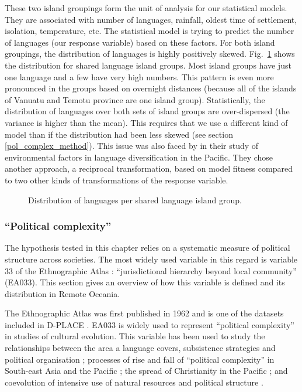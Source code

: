 \documentclass[a4paper,10pt]{article} %
\begin{document}
These two island groupings form the unit of analysis for our statistical models. They are associated with number of languages, rainfall, oldest time of settlement, isolation, temperature, etc. The statistical model is trying to predict the number of languages (our response variable) based on these factors. For both island groupings, the distribution of languages is highly positively skewed. Fig.~\ref{dist_lg_medium} shows the distribution for shared language island groups. Most island groups have just one language and a few have very high numbers. This pattern is even more pronounced in the groups based on overnight distances (because all of the islands of Vanuatu and Temotu province are one island group). Statistically, the distribution of languages over both sets of island groups are over-dispersed (the variance is higher than the mean).
This requires that we use a different kind of model than if the distribution had been less skewed (see section \ref{pol_complex_method}). This issue was also faced by \citet{gavin2012island} in their study of environmental factors in language diversification in the Pacific. They chose another approach, a reciprocal transformation, based on model fitness compared to two other kinds of transformations of the response variable.

\begin{figure}[H]
\centering
\caption{{Distribution of languages per shared language island group.}}
\label{dist_lg_medium}
\end{figure}

\subsubsection{``Political complexity''}
\label{prediting:sec:pol:complex}
The hypothesis tested in this chapter relies on a systematic measure of political structure across societies. The most widely used variable in this regard is variable 33 of the Ethnographic Atlas \citep{EA_1971}: ``jurisdictional hierarchy beyond local community'' (EA033). This section gives an overview of how this variable is defined and its distribution in Remote Oceania. 

The Ethnographic Atlas was first published in 1962 and is one of the datasets included in D-PLACE \citep{d_place_all}. EA033 is widely used to represent ``political complexity'' in studies of cultural evolution. This variable has been used to study the relationships between the area a language covers, subsistence strategies and political organisation \citep{curriemace2009}; processes of rise and fall of ``political complexity'' in South-east Asia and the Pacific \citep{currie2010rise}; the spread of Christianity in the Pacific \citep{watts_2018}; and coevolution of intensive use of natural resources and political structure \citep{sheehan2018coevolution}.  
\end{document}
